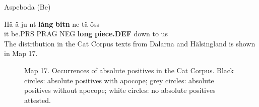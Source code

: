 
\item 

Aspeboda (Be)



 \ea\label{}
\gll Hä  ä  ju  nt  \textbf{lång} \textbf{bitn} ne  tä  ôss\\


it  be.PRS  PRAG  NEG  \textbf{long} \textbf{piece.DEF} down  to  us\\

The distribution in the Cat Corpus texts from Dalarna and Hälsingland is shown in Map 17.

\begin{figure}[h]

\begin{minipage}{3.67708in}

\label{bkm:Ref160012437}Map 17. Occurrences of absolute positives in the Cat Corpus. Black circles: absolute positives with apocope; grey circles: absolute positives without apocope; white circles: no absolute positives attested.


\end{minipage}

\end{figure}